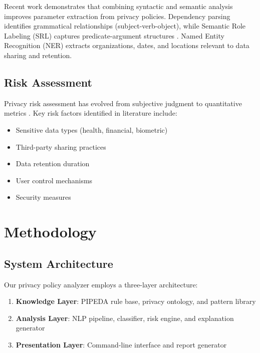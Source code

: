 \documentclass[conference]{IEEEtran}
\begin{document}
Recent work demonstrates that combining syntactic and semantic analysis improves parameter extraction from privacy policies. Dependency parsing identifies grammatical relationships (subject-verb-object), while Semantic Role Labeling (SRL) captures predicate-argument structures \cite{systematic-review}. Named Entity Recognition (NER) extracts organizations, dates, and locations relevant to data sharing and retention.

\subsection{Risk Assessment}

Privacy risk assessment has evolved from subjective judgment to quantitative metrics \cite{clear}. Key risk factors identified in literature include:

\begin{itemize}
    \item Sensitive data types (health, financial, biometric) \cite{oculus-study}
    \item Third-party sharing practices \cite{miniapps}
    \item Data retention duration \cite{gdpr-ai}
    \item User control mechanisms \cite{assistive-tech}
    \item Security measures \cite{oculus-study}
\end{itemize}

\section{Methodology}

\subsection{System Architecture}

Our privacy policy analyzer employs a three-layer architecture:

\begin{enumerate}
    \item \textbf{Knowledge Layer}: PIPEDA rule base, privacy ontology, and pattern library
    \item \textbf{Analysis Layer}: NLP pipeline, classifier, risk engine, and explanation generator
    \item \textbf{Presentation Layer}: Command-line interface and report generator
\end{enumerate}
\end{document}
